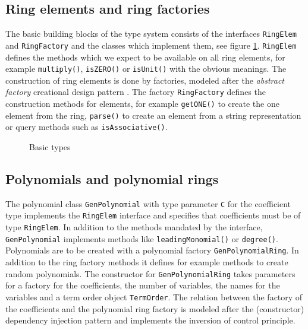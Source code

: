 \documentclass{llncs}
\newcommand{\code}[1]{\texttt{#1}}
\begin{document}
\subsection{Ring elements and ring factories} %

The basic building blocks of the type system consists of the
interfaces \code{RingElem} and \code{RingFactory} and the classes
which implement them, see figure \ref{fig:bastype}. \code{RingElem}
defines the methods which we expect to be available on all ring
elements, for example \code{multiply()},
\code{isZERO()} or \code{isUnit()} with the obvious meanings. The
construction of ring elements is done by factories, modeled after the
{\em abstract factory} creational design pattern \cite{Gamma:1995}.
The factory \code{RingFactory} defines the construction methods for
elements, for example \code{get\-ONE()} to create the one element from
the ring, 
\code{parse()} to create an element from a string representation or query methods such as
\code{is\-Asso\-ciative()}. %

\begin{figure}[thb]
\centering
{}
\caption{Basic types}
\label{fig:bastype}
\end{figure}


\subsection{Polynomials and polynomial rings} %

The polynomial class \code{Gen\-Polynomial} with type parameter
\code{C} for the coefficient type implements the \code{Ring\-Elem}
interface and specifies that coefficients must be of type
\code{Ring\-Elem}.  In addition to the methods mandated by the
interface, \code{Gen\-Polynomial} implements methods like
\code{leading\-Monomial()} or \code{degree()}.  Polynomials are to be
created with a polynomial factory \code{Gen\-Polynomial\-Ring}. In
addition to the ring factory methods it defines for example methods
to create random polynomials.  The constructor for
\code{Gen\-Polynomial\-Ring} takes parameters for a factory for the
coefficients, the number of variables, the names for the variables and
a term order object \code{Term\-Order}. The relation between the
factory of the coefficients and the polynomial ring factory is modeled
after the (constructor) dependency injection pattern and implements the
inversion of control principle.
\end{document}
